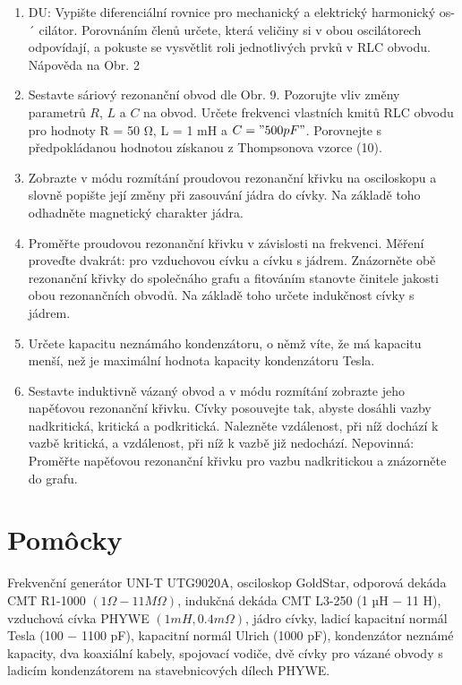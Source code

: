 \documentclass[a4paper,10pt]{article}
\begin{document}
\begin{enumerate}
\item DU: Vypište diferenciální rovnice pro mechanický a elektrický harmonický os- ´
cilátor. Porovnáním členů určete, která veličiny si v obou oscilátorech odpovídají, a
pokuste se vysvětlit roli jednotlivých prvků v RLC obvodu. Nápověda na Obr. 2\cite{C_1}
\item Sestavte sáriový rezonanční obvod dle Obr. 9. Pozorujte vliv změny parametrů $R$, $L$ a $C$
na obvod. Určete frekvenci vlastních kmitů RLC obvodu pro hodnoty R = 50 Ω, L = 1 mH a
$C = "500 pF"$. Porovnejte s předpokládanou hodnotou získanou z Thompsonova vzorce (10).
\item Zobrazte v módu rozmítání proudovou rezonanční křivku na osciloskopu a slovně popište její
změny při zasouvání jádra do cívky. Na základě toho odhadněte magnetický charakter jádra.
\item Proměřte proudovou rezonanční křivku v závislosti na frekvenci. Měření proveďte dvakrát:
pro vzduchovou cívku a cívku s jádrem. Znázorněte obě rezonanční křivky do společnáho grafu a
fitováním stanovte činitele jakosti obou rezonančních obvodů. Na základě toho určete indukčnost
cívky s jádrem.
\item Určete kapacitu neznámáho kondenzátoru, o němž víte, že má kapacitu menší, než je maximální
hodnota kapacity kondenzátoru Tesla.
\item Sestavte induktivně vázaný obvod a v módu rozmítání zobrazte jeho napěťovou rezonanční
křivku. Cívky posouvejte tak, abyste dosáhli vazby nadkritická, kritická a podkritická. Nalezněte
vzdálenost, při níž dochází k vazbě kritická, a vzdálenost, při níž k vazbě již nedochází.
Nepovinná: Proměřte napěťovou rezonanční křivku pro vazbu nadkritickou a znázorněte do grafu.

\end{enumerate}



\section{Pomôcky}
Frekvenční generátor UNI-T UTG9020A, osciloskop GoldStar, 
odporová dekáda CMT R1-1000 $(1\Omega − 11 M\Omega)$, indukčná dekáda
CMT L3-250 (1 µH − 11 H), vzduchová cívka PHYWE $(1 mH, 0.4 m\Omega)$, jádro cívky, ladicí kapacitní
normál Tesla (100 − 1100 pF), kapacitní normál Ulrich (1000 pF), kondenzátor neznámé
kapacity, dva koaxiální kabely, spojovací vodiče, dvě cívky pro vázané obvody s ladicím kondenzátorem
na stavebnicových dílech PHYWE.
\end{document}
